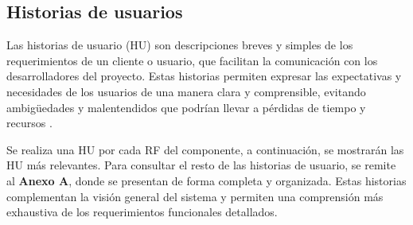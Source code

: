 \subsection{Historias de usuarios}

Las historias de usuario (HU) son descripciones breves y simples de los requerimientos de un cliente o usuario, que facilitan la comunicación con los desarrolladores del proyecto. Estas historias permiten expresar las expectativas y necesidades de los usuarios de una manera clara y comprensible, evitando ambigüedades y malentendidos que podrían llevar a pérdidas de tiempo y recursos \cite{menzinsky2018historias}.

Se realiza una HU por cada RF del componente, a continuación, se mostrarán las HU más relevantes. Para consultar el resto de las historias de usuario, se remite al \textbf{Anexo A}, donde se presentan de forma completa y organizada. Estas historias complementan la visión general del sistema y permiten una comprensión más exhaustiva de los requerimientos funcionales detallados.


